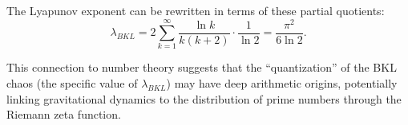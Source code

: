 \documentclass[aps,prd,reprint,nofootinbib,amsmath,amssymb,amsfonts]{revtex4-2}
\begin{document}
The Lyapunov exponent can be rewritten in terms of these partial quotients:
\begin{equation}
    \lambda_{BKL} = 2 \sum_{k=1}^{\infty} \frac{\ln k}{k(k+2)} \cdot \frac{1}{\ln 2} = \frac{\pi^2}{6 \ln 2}.
\end{equation}

This connection to number theory suggests that the ``quantization'' of the BKL chaos (the specific value of $\lambda_{BKL}$) may have deep arithmetic origins, potentially linking gravitational dynamics to the distribution of prime numbers through the Riemann zeta function.



\end{document}
